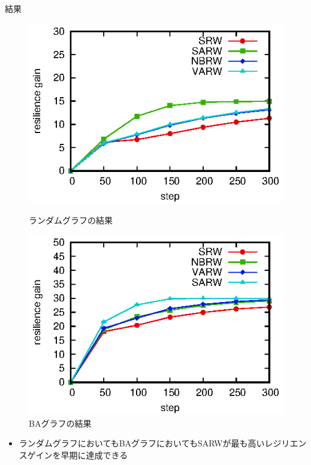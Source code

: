\documentclass[compress,dvipdfmx,11pt]{beamer}
\begin{document}
\begin{frame}[label={sec:org8e277fb}]{結果}
\begin{center}
\begin{figure}[h!]
  \begin{minipage}[t]{0.45\textwidth}
    \centering
    \includegraphics[width=\textwidth]{./figure/random-result.eps}
    \caption{ランダムグラフの結果}
  \end{minipage}
  \hfill
  \begin{minipage}[t]{0.45\textwidth}
    \centering
    \includegraphics[width=\textwidth]{./figure/ba-result.eps}
    \caption{BAグラフの結果}
  \end{minipage}
\end{figure}
\end{center}
\begin{itemize}
\item ランダムグラフにおいてもBAグラフにおいてもSARWが最も高いレジリエンスゲインを早期に達成できる
\end{itemize}
\end{frame}
\end{document}
